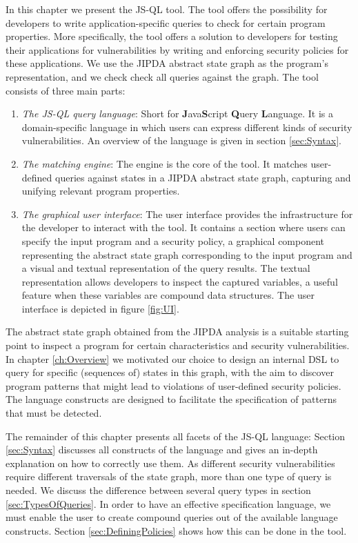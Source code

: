 In this chapter we present the JS-QL tool. The tool offers the possibility for developers to write application-specific queries to check for certain program properties. More specifically, the tool offers a solution to developers for testing their applications for vulnerabilities by writing and enforcing security policies for these applications. We use the JIPDA abstract state graph as the program's representation, and we check check all queries against the graph. The tool consists of three main parts: 
\begin{enumerate}
\item \textit{The JS-QL query language}: Short for \textbf{J}ava\textbf{S}cript \textbf{Q}uery \textbf{L}anguage. It is a domain-specific language in which users can express different kinds of security vulnerabilities. An overview of the language is given in section \ref{sec:Syntax}.
\item \textit{The matching engine}: The engine is the core of the tool. It matches user-defined queries against states in a JIPDA abstract state graph, capturing and unifying relevant program properties.
\item \textit{The graphical user interface}: The user interface provides the infrastructure for the developer to interact with the tool. It contains a section where users can specify the input program and a security policy, a graphical component representing the abstract state graph corresponding to the input program and a visual and textual representation of the query results. The textual representation allows developers to inspect the captured variables, a useful feature when these variables are compound data structures. The user interface is depicted in figure \ref{fig:UI}.
\end{enumerate}

The abstract state graph obtained from the JIPDA analysis is a suitable starting point to inspect a program for certain characteristics and security vulnerabilities. In chapter \ref{ch:Overview} we motivated our choice to design an internal DSL to query for specific (sequences of) states in this graph, with the aim to discover program patterns that might lead to violations of user-defined security policies. The language constructs are designed to facilitate the specification of patterns that must be detected. 

The remainder of this chapter presents all facets of the JS-QL language: Section \ref{sec:Syntax} discusses all constructs of the language and gives an in-depth explanation on how to correctly use them. As different security vulnerabilities require different traversals of the state graph, more than one type of query is needed. We discuss the difference between several query types in section \ref{sec:TypesOfQueries}. In order to have an effective specification language, we must enable the user to create compound queries out of the available language constructs. Section \ref{sec:DefiningPolicies} shows how this can be done in the tool.

